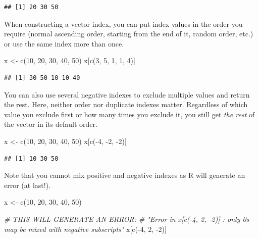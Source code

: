 \documentclass[
]{book}
\newenvironment{Shaded}{\begin{snugshade}}{\end{snugshade}}
\newcommand{\CommentTok}[1]{\textcolor[rgb]{0.56,0.35,0.01}{\textit{#1}}}
\newcommand{\DecValTok}[1]{\textcolor[rgb]{0.00,0.00,0.81}{#1}}
\newcommand{\FunctionTok}[1]{\textcolor[rgb]{0.00,0.00,0.00}{#1}}
\newcommand{\NormalTok}[1]{#1}
\newcommand{\OtherTok}[1]{\textcolor[rgb]{0.56,0.35,0.01}{#1}}
\newcommand{\SpecialCharTok}[1]{\textcolor[rgb]{0.00,0.00,0.00}{#1}}
\begin{document}
\begin{verbatim}
## [1] 20 30 50
\end{verbatim}

When constructing a vector index, you can put index values in the order you require (normal ascending order, starting from the end of it, random order, etc.) or use the same index more than once.

\begin{Shaded}
\begin{Highlighting}[]
\NormalTok{x }\OtherTok{\textless{}{-}} \FunctionTok{c}\NormalTok{(}\DecValTok{10}\NormalTok{, }\DecValTok{20}\NormalTok{, }\DecValTok{30}\NormalTok{, }\DecValTok{40}\NormalTok{, }\DecValTok{50}\NormalTok{)}
\NormalTok{x[}\FunctionTok{c}\NormalTok{(}\DecValTok{3}\NormalTok{, }\DecValTok{5}\NormalTok{, }\DecValTok{1}\NormalTok{, }\DecValTok{1}\NormalTok{, }\DecValTok{4}\NormalTok{)]}
\end{Highlighting}
\end{Shaded}

\begin{verbatim}
## [1] 30 50 10 10 40
\end{verbatim}

You can also use several negative indexes to exclude multiple values and return the rest. Here, neither order nor duplicate indexes matter. Regardless of which value you exclude first or how many times you exclude it, you still get \emph{the rest} of the vector in its default order.

\begin{Shaded}
\begin{Highlighting}[]
\NormalTok{x }\OtherTok{\textless{}{-}} \FunctionTok{c}\NormalTok{(}\DecValTok{10}\NormalTok{, }\DecValTok{20}\NormalTok{, }\DecValTok{30}\NormalTok{, }\DecValTok{40}\NormalTok{, }\DecValTok{50}\NormalTok{)}
\NormalTok{x[}\FunctionTok{c}\NormalTok{(}\SpecialCharTok{{-}}\DecValTok{4}\NormalTok{, }\SpecialCharTok{{-}}\DecValTok{2}\NormalTok{, }\SpecialCharTok{{-}}\DecValTok{2}\NormalTok{)]}
\end{Highlighting}
\end{Shaded}

\begin{verbatim}
## [1] 10 30 50
\end{verbatim}

Note that you cannot mix positive and negative indexes as R will generate an error (at last!).

\begin{Shaded}
\begin{Highlighting}[]
\NormalTok{x }\OtherTok{\textless{}{-}} \FunctionTok{c}\NormalTok{(}\DecValTok{10}\NormalTok{, }\DecValTok{20}\NormalTok{, }\DecValTok{30}\NormalTok{, }\DecValTok{40}\NormalTok{, }\DecValTok{50}\NormalTok{)}

\CommentTok{\# THIS WILL GENERATE AN ERROR: }
\CommentTok{\# "Error in x[c({-}4, 2, {-}2)] : only 0\textquotesingle{}s may be mixed with negative subscripts"}
\NormalTok{x[}\FunctionTok{c}\NormalTok{(}\SpecialCharTok{{-}}\DecValTok{4}\NormalTok{, }\DecValTok{2}\NormalTok{, }\SpecialCharTok{{-}}\DecValTok{2}\NormalTok{)]}
\end{Highlighting}
\end{Shaded}
\end{document}
